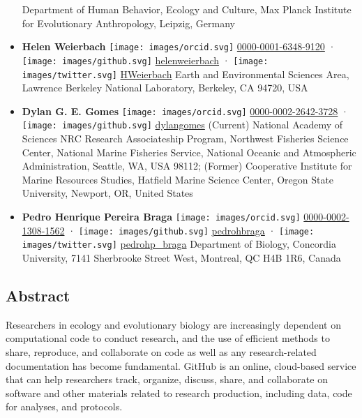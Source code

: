 \begin{itemize}
  Department of Human Behavior, Ecology and Culture, Max Planck Institute for Evolutionary Anthropology, Leipzig, Germany
\item
  \textbf{Helen Weierbach}
  \texttt{[image: images/orcid.svg]}
  \href{https://orcid.org/0000-0001-6348-9120}{0000-0001-6348-9120}
  · \texttt{[image: images/github.svg]}
  \href{https://github.com/helenweierbach}{helenweierbach}
  · \texttt{[image: images/twitter.svg]}
  \href{https://twitter.com/HWeierbach}{HWeierbach}
  Earth and Environmental Sciences Area, Lawrence Berkeley National Laboratory, Berkeley, CA 94720, USA
\item
  \textbf{Dylan G. E. Gomes}
  \texttt{[image: images/orcid.svg]}
  \href{https://orcid.org/0000-0002-2642-3728}{0000-0002-2642-3728}
  · \texttt{[image: images/github.svg]}
  \href{https://github.com/dylangomes}{dylangomes}
  (Current) National Academy of Sciences NRC Research Associateship Program, Northwest Fisheries Science Center, National Marine Fisheries Service, National Oceanic and Atmospheric Administration, Seattle, WA, USA 98112; (Former) Cooperative Institute for Marine Resources Studies, Hatfield Marine Science Center, Oregon State University, Newport, OR, United States
\item
  \textbf{Pedro Henrique Pereira Braga}
  \texttt{[image: images/orcid.svg]}
  \href{https://orcid.org/0000-0002-1308-1562}{0000-0002-1308-1562}
  · \texttt{[image: images/github.svg]}
  \href{https://github.com/pedrohbraga}{pedrohbraga}
  · \texttt{[image: images/twitter.svg]}
  \href{https://twitter.com/pedrohp_braga}{pedrohp\_braga}
  Department of Biology, Concordia University, 7141 Sherbrooke Street West, Montreal, QC H4B 1R6, Canada
\end{itemize}

\hypertarget{abstract}{%
\subsection{Abstract}\label{abstract}}

Researchers in ecology and evolutionary biology are increasingly dependent on computational code to conduct research, and the use of efficient methods to share, reproduce, and collaborate on code as well as any research-related documentation has become fundamental.
GitHub is an online, cloud-based service that can help researchers track, organize, discuss, share, and collaborate on software and other materials related to research production, including data, code for analyses, and protocols.


